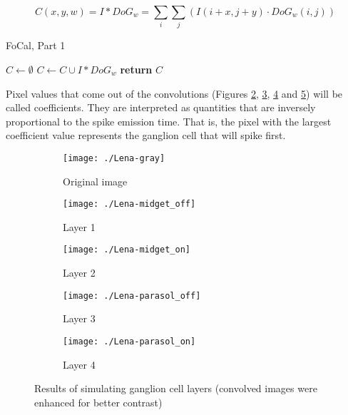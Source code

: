 \begin{equation}
\label{eq-convolution}
C(x,y,w) = I \ast DoG_w = \sum_i \sum_j \left( I(i+x, j+y) \cdot DoG_w(i,j)\right)
\end{equation}

\begin{algorithm}[h]
  \caption{FoCal, Part 1}
  \label{code-focal-conv}
  \begin{algorithmic}
    \State $C \leftarrow \emptyset$
    \State $C \leftarrow C \cup I \ast DoG_w$
    \EndFor
    \State \textbf{return} $C$
    \EndProcedure
  \end{algorithmic}
\end{algorithm}

Pixel values that come out of the convolutions (Figures \ref{pic-lena-M-OFF}, \ref{pic-lena-M-ON}, \ref{pic-lena-P-OFF} and \ref{pic-lena-P-ON}) will be called coefficients. They are interpreted as quantities that are inversely proportional to the spike emission time. That is, the pixel with the largest coefficient value represents the ganglion cell that will spike first.

\begin{figure}[hbt]
  \centering
  \begin{subfigure}[t]{0.32\textwidth}
    \centering
    \captionsetup{justification=centering,margin=0.1cm}
    \texttt{[image: ./Lena-gray]}
    \caption{Original image}
    \label{pic-lena}
  \end{subfigure}
  \begin{subfigure}[t]{0.32\textwidth}
    \centering
    \captionsetup{justification=centering,margin=0.1cm}
    \texttt{[image: ./Lena-midget\_off]}
    \caption{Layer 1}
    \label{pic-lena-M-OFF}
  \end{subfigure}
  \begin{subfigure}[t]{0.32\textwidth}
    \centering
    \captionsetup{justification=centering,margin=0.1cm}
    \texttt{[image: ./Lena-midget\_on]}
    \caption{Layer 2}
    \label{pic-lena-M-ON}
  \end{subfigure}
  \begin{subfigure}[t]{0.32\textwidth}
    \vspace*{0.8em}
    \centering
    \captionsetup{justification=centering,margin=0.1cm}
    \texttt{[image: ./Lena-parasol\_off]}
    \caption{Layer 3}
    \label{pic-lena-P-OFF}
  \end{subfigure}
  \begin{subfigure}[t]{0.32\textwidth}
    \vspace*{0.8em}
    \centering
    \captionsetup{justification=centering,margin=0.1cm}
    \texttt{[image: ./Lena-parasol\_on]}
    \caption{Layer 4}
    \label{pic-lena-P-ON}
  \end{subfigure}
  \caption{Results of simulating ganglion cell layers (convolved images were enhanced for better contrast)}
  \label{fig-convolution-results}
\end{figure}

